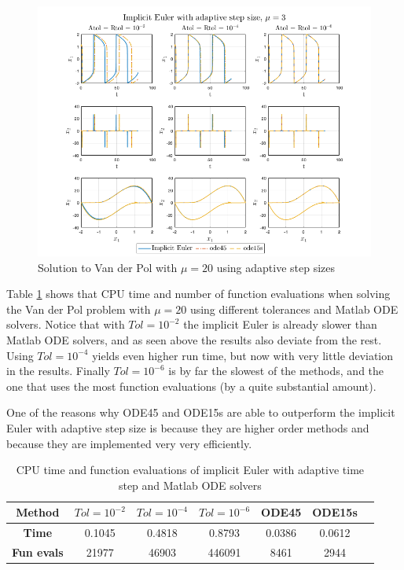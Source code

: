 \begin{figure}[H]
    \centering
    \includegraphics[width=\textwidth]{graphics/opg3/mu20_adap.png}
    \caption{Solution to Van der Pol with $\mu = 20$ using adaptive step sizes}
    \label{fig3:adap_mu20}
\end{figure}

Table \ref{tab3:mu20_adap} shows that CPU time and number of function evaluations when solving the Van der Pol problem with $\mu = 20$ using different tolerances and Matlab ODE solvers. Notice that with $Tol = 10^{-2}$ the implicit Euler is already slower than Matlab ODE solvers, and as seen above the results also deviate from the rest. Using $Tol = 10^{-4}$ yields even higher run time, but now with very little deviation in the results. Finally $Tol = 10^{-6}$ is by far the slowest of the methods, and the one that uses the most function evaluations (by a quite substantial amount). 

One of the reasons why ODE45 and ODE15s are able to outperform the implicit Euler with adaptive step size is because they are higher order methods and because they are implemented very very efficiently. 

\begin{table}[H]
    \centering
    \caption{CPU time and function evaluations of implicit Euler with adaptive time step and Matlab ODE solvers}
    \begin{tabular}{|c||c|c|c|c|c|c|} \hline
         \textbf{Method}    & $Tol = 10^{-2}$&   $Tol = 10^{-4}$ & $Tol = 10^{-6}$ & ODE45 & ODE15s     \\ \hline \hline 
         \textbf{Time}      & 0.1045 &    0.4818 &    0.8793 & 0.0386 & 0.0612   \\ \hline
         \textbf{Fun evals} &  21977 &  46903 &      446091 & 8461 & 2944  \\ \hline
    \end{tabular}
    \label{tab3:mu20_adap}
\end{table}

